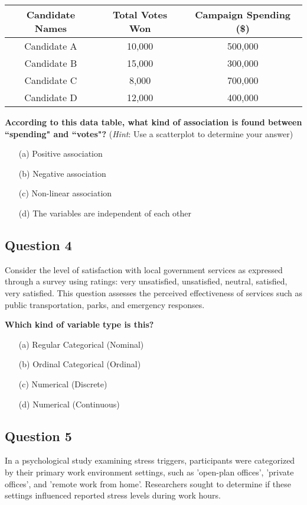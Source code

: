 \documentclass{article}
\begin{document}
\begin{table}[h!]
\centering
\begin{tabular}{|c|c|c|}
    \hline
    \textbf{Candidate Names} & \textbf{Total Votes Won} & \textbf{Campaign Spending (\$)} \\
    \hline
    Candidate A & 10,000 & 500,000 \\
    Candidate B & 15,000 & 300,000 \\
    Candidate C & 8,000 & 700,000 \\
    Candidate D & 12,000 & 400,000 \\
    \hline
\end{tabular}
\end{table}

\textbf{According to this data table, what kind of association is found between ``spending" and ``votes"?} (\emph{Hint}: Use a scatterplot to determine your answer)
\begin{enumerate}
    \item[(a)] Positive association
    \item[(b)] Negative association
    \item[(c)] Non-linear association
    \item[(d)] The variables are independent of each other
\end{enumerate}

\subsection*{Question 4}
Consider the level of satisfaction with local government services as expressed through a survey using ratings: very unsatisfied, unsatisfied, neutral, satisfied, very satisfied. This question assesses the perceived effectiveness of services such as public transportation, parks, and emergency responses.

\textbf{Which kind of variable type is this?}
\begin{enumerate}
    \item[(a)] Regular Categorical (Nominal)
    \item[(b)] Ordinal Categorical (Ordinal)
    \item[(c)] Numerical (Discrete)
    \item[(d)] Numerical (Continuous)
\end{enumerate}

\subsection*{Question 5}
In a psychological study examining stress triggers, participants were categorized by their primary work environment settings, such as 'open-plan offices', 'private offices', and 'remote work from home'. Researchers sought to determine if these settings influenced reported stress levels during work hours.
\end{document}
